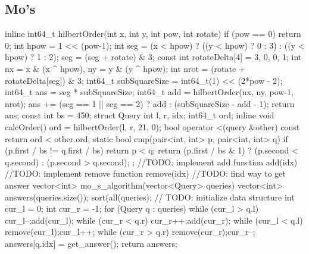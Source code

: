 \documentclass[10pt, landscape, twocolumn, a4paper, notitlepage]{article}
\begin{document}
\subsection{Mo's}
\begin{code}
inline int64_t hilbertOrder(int x, int y, int pow, int rotate) {
    if (pow == 0) return 0;
    int hpow = 1 << (pow-1);
    int seg = (x < hpow) 
            ? ((y < hpow) ? 0 : 3) 
            : ((y < hpow) ? 1 : 2);
    seg = (seg + rotate) & 3;
    const int rotateDelta[4] = {3, 0, 0, 1};
    int nx = x & (x ^ hpow), ny = y & (y ^ hpow);
    int nrot = (rotate + rotateDelta[seg]) & 3;
    int64_t subSquareSize = int64_t(1) << (2*pow - 2);
    int64_t ans = seg * subSquareSize;
    int64_t add = hilbertOrder(nx, ny, pow-1, nrot);
    ans += (seg == 1 || seg == 2) ? add : (subSquareSize - add - 1);
    return ans;
}
const int bs = 450;
struct Query {
    int l, r, idx;
    int64_t ord;
    inline void calcOrder() {
        ord = hilbertOrder(l, r, 21, 0);
    }
    bool operator <(query &other) const {
        return ord < other.ord;
    }
    static bool cmp(pair<int, int> p, pair<int, int> q) {
        if (p.first / bs != q.first / bs)
            return p < q;
        return (p.first / bs & 1) ? (p.second < q.second) : (p.second > q.second);
    }
};
//TODO: implement add function add(idx)
//TODO: implement remove function remove(idx)
//TODO: find way to get answer
vector<int> mo_s_algorithm(vector<Query> queries) {
    vector<int> answers(queries.size());
    sort(all(queries);
    // TODO: initialize data structure
    int cur_l = 0;
    int cur_r = -1;
    for (Query q : queries) {
        while (cur_l > q.l) {
            cur_l--;add(cur_l);
        }
        while (cur_r < q.r) {
            cur_r++;add(cur_r);
        }
        while (cur_l < q.l) {
            remove(cur_l);cur_l++;
        }
        while (cur_r > q.r) {
            remove(cur_r);cur_r--;
        }
        answers[q.idx] = get_answer();
    }
    return answers;
}
\end{code}
\end{document}
